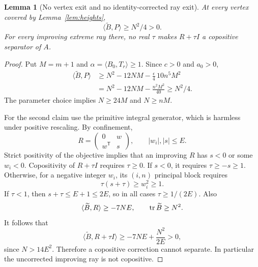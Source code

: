 \documentclass[11pt]{article}
\newtheorem{lemma}[theorem]{Lemma}
\theoremstyle{remark}\newtheorem{remark}[theorem]{Remark}
\newcommand{\ip}[2]{\langle #1,#2\rangle}\newcommand{\trans}{^{\mathsf T}}
\begin{document}
\begin{lemma}[No vertex exit and no identity-corrected ray exit]\label{lem:noexit}
At every vertex covered by Lemma~\ref{lem:heights},
\[
 \ip{\widetilde B}P\ge N^2/4>0.
\]
For every improving extreme ray there, no real $\tau$ makes $R+\tau I$ a copositive separator of $A$.
\end{lemma}
\begin{proof}
Put $M=m+1$ and $\alpha=\ip{B_0}{T_r}\ge1$. Since $c>0$ and $a_0>0$,
\begin{align*}
 \ip{\widetilde B}P
 &\ge N^2-12NM-\frac\epsilon4\,10n^5M^2\\
 &=N^2-12NM-\frac{n^2M^2}{40}\ge N^2/4.
\end{align*}
The parameter choice implies $N\ge24M$ and $N\ge nM$.

For the second claim use the primitive integral generator, which is harmless under positive rescaling. By confinement,
\[
 R=\begin{pmatrix}0&w\\w\trans&s\end{pmatrix},\qquad |w_i|,|s|\le E.
\]
Strict positivity of the objective implies that an improving $R$ has $s<0$ or some $w_i<0$. Copositivity of $R+\tau I$ requires $\tau\ge0$. If $s<0$, it requires $\tau\ge-s\ge1$. Otherwise, for a negative integer $w_i$, its $(i,n)$ principal block requires
\[
 \tau(s+\tau)\ge w_i^2\ge1.
\]
If $\tau<1$, then $s+\tau\le E+1\le2E$, so in all cases $\tau\ge1/(2E)$. Also
\[
 \ip{\widetilde B}R\ge-7NE,\qquad \tr\widetilde B\ge N^2.
\]
It follows that
\[
 \ip{\widetilde B}{R+\tau I}
 \ge-7NE+\frac{N^2}{2E}>0,
\]
since $N>14E^2$. Therefore a copositive correction cannot separate. In particular the uncorrected improving ray is not copositive.
\end{proof}
\end{document}
